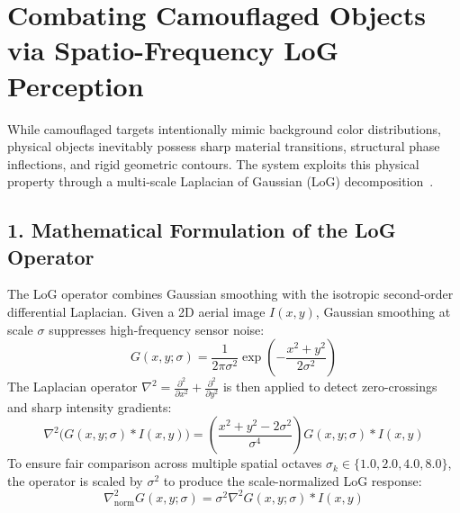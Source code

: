 \documentclass[12pt,a4paper]{report}
\begin{document}
\section{Combating Camouflaged Objects via Spatio-Frequency LoG Perception}
While camouflaged targets intentionally mimic background color distributions, physical objects inevitably possess sharp material transitions, structural phase inflections, and rigid geometric contours. The system exploits this physical property through a multi-scale Laplacian of Gaussian (LoG) decomposition~\cite{lindeberg1994scale}.

\subsection{1. Mathematical Formulation of the LoG Operator}
The LoG operator combines Gaussian smoothing with the isotropic second-order differential Laplacian. Given a 2D aerial image $I(x, y)$, Gaussian smoothing at scale $\sigma$ suppresses high-frequency sensor noise:
\begin{equation}
    G(x, y; \sigma) = \frac{1}{2\pi\sigma^2} \exp\left(-\frac{x^2 + y^2}{2\sigma^2}\right)
\end{equation}
The Laplacian operator $\nabla^2 = \frac{\partial^2}{\partial x^2} + \frac{\partial^2}{\partial y^2}$ is then applied to detect zero-crossings and sharp intensity gradients:
\begin{equation}
    \nabla^2 \big(G(x, y; \sigma) * I(x, y)\big) = \left( \frac{x^2 + y^2 - 2\sigma^2}{\sigma^4} \right) G(x, y; \sigma) * I(x, y)
\end{equation}
To ensure fair comparison across multiple spatial octaves $\sigma_k \in \{1.0, 2.0, 4.0, 8.0\}$, the operator is scaled by $\sigma^2$ to produce the scale-normalized LoG response:
\begin{equation}
    \nabla^2_{\text{norm}} G(x, y; \sigma) = \sigma^2 \nabla^2 G(x, y; \sigma) * I(x, y)
\end{equation}
\end{document}
